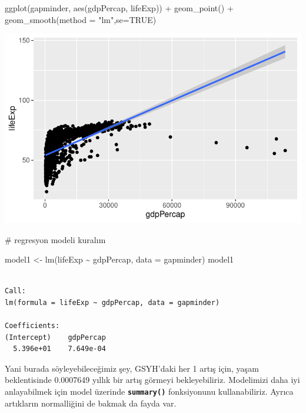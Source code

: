 \documentclass[
  letterpaper,
  DIV=11,
  numbers=noendperiod]{scrreprt}
\newenvironment{Shaded}{\begin{snugshade}}{\end{snugshade}}
\newcommand{\AttributeTok}[1]{\textcolor[rgb]{0.40,0.45,0.13}{#1}}
\newcommand{\CommentTok}[1]{\textcolor[rgb]{0.37,0.37,0.37}{#1}}
\newcommand{\ConstantTok}[1]{\textcolor[rgb]{0.56,0.35,0.01}{#1}}
\newcommand{\FunctionTok}[1]{\textcolor[rgb]{0.28,0.35,0.67}{#1}}
\newcommand{\NormalTok}[1]{\textcolor[rgb]{0.00,0.23,0.31}{#1}}
\newcommand{\OtherTok}[1]{\textcolor[rgb]{0.00,0.23,0.31}{#1}}
\newcommand{\SpecialCharTok}[1]{\textcolor[rgb]{0.37,0.37,0.37}{#1}}
\newcommand{\StringTok}[1]{\textcolor[rgb]{0.13,0.47,0.30}{#1}}
\begin{document}
\begin{Shaded}
\begin{Highlighting}[]
\FunctionTok{ggplot}\NormalTok{(gapminder, }\FunctionTok{aes}\NormalTok{(gdpPercap, lifeExp)) }\SpecialCharTok{+}
  \FunctionTok{geom\_point}\NormalTok{() }\SpecialCharTok{+} 
  \FunctionTok{geom\_smooth}\NormalTok{(}\AttributeTok{method =} \StringTok{"lm"}\NormalTok{,}\AttributeTok{se=}\ConstantTok{TRUE}\NormalTok{)}
\end{Highlighting}
\end{Shaded}

\includegraphics{regresyon_files/figure-pdf/unnamed-chunk-1-2.pdf}

\begin{Shaded}
\begin{Highlighting}[]
\CommentTok{\# regresyon modeli kuralım}

\NormalTok{model1 }\OtherTok{\textless{}{-}} \FunctionTok{lm}\NormalTok{(lifeExp }\SpecialCharTok{\textasciitilde{}}\NormalTok{ gdpPercap, }\AttributeTok{data =}\NormalTok{ gapminder)}
\NormalTok{model1}
\end{Highlighting}
\end{Shaded}

\begin{verbatim}

Call:
lm(formula = lifeExp ~ gdpPercap, data = gapminder)

Coefficients:
(Intercept)    gdpPercap  
  5.396e+01    7.649e-04  
\end{verbatim}

\begin{tcolorbox}[enhanced jigsaw, colback=white, coltitle=black, colbacktitle=quarto-callout-note-color!10!white, opacitybacktitle=0.6, opacityback=0, toprule=.15mm, bottomrule=.15mm, bottomtitle=1mm, rightrule=.15mm, breakable, arc=.35mm, colframe=quarto-callout-note-color-frame, titlerule=0mm, left=2mm, leftrule=.75mm, toptitle=1mm, title=\textcolor{quarto-callout-note-color}{\faInfo}\hspace{0.5em}{Yorum}]

Yani burada söyleyebileceğimiz şey, GSYH'daki her 1 artış için, yaşam
beklentisinde 0.0007649 yıllık bir artış görmeyi bekleyebiliriz.
Modelimizi daha iyi anlayabilmek için model üzerinde
\textbf{\texttt{summary()}} fonksiyonunu kullanabiliriz. Ayrıca
artıkların normalliğini de bakmak da fayda var.

\end{tcolorbox}
\end{document}
